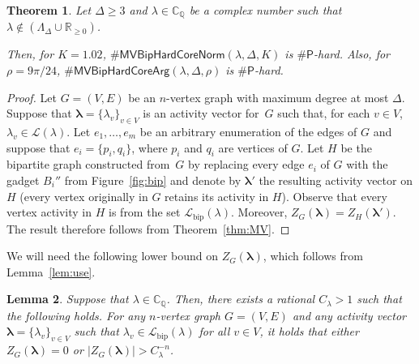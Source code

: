 \documentclass[11pt]{article}
\newtheorem{theorem}{Theorem}
\newtheorem{lemma}[theorem]{Lemma}
\def\numP{\#\mathsf{P}}
\def\Reals{\mathbb{R}}
\def\CQ{\mathbb{C}_{\mathbb{Q}}}
\def\LambdaD{\Lambda_\Delta}
\def\Lbip{\mathcal{L}_{\mathrm{bip}}}
\def\lambdab{\ensuremath{\boldsymbol{\lambda}}}
\def\FactorMVBipHardCore#1{\#\ensuremath{\mathsf{MVBipHardCoreNorm}(\lambda,\Delta,#1)}}
\def\ArgMVBipHardCore#1{\#\ensuremath{\mathsf{MVBipHardCoreArg}(\lambda,\Delta,#1)}}
\begin{document}
\begin{theorem}\label{thm:BipMV}
Let $\Delta\geq 3$ and  
$\lambda\in \CQ$ be a complex number such that
$\lambda\not\in (\LambdaD \cup \Reals_{\geq 0})$.  

Then, for $ K  =1.02$,
$\FactorMVBipHardCore{K}$ is $\numP$-hard. Also, for $\rho = 9\pi/24$, 
$\ArgMVBipHardCore{\rho}$ is $\numP$-hard.
\end{theorem}
\begin{proof}
Let $G=(V,E)$ be an $n$-vertex graph with maximum degree at most $\Delta$. Suppose that $\lambdab=\{\lambda_v\}_{v\in V}$ is an activity vector for~$G$ such that,
for each $v\in V$, $\lambda_v \in \mathcal{L}(\lambda)$. Let $e_1,\hdots, e_m$ be an arbitrary enumeration of the edges of $G$ and suppose that $e_i=\{p_i,q_i\}$, where $p_i$ and $q_i$ are vertices of $G$.  Let $H$ be the bipartite graph constructed from~$G$ by  
replacing every edge $e_i$ of $G$ with the gadget $B_i''$ from Figure~\ref{fig:bip} and denote by $\lambdab'$ the resulting activity vector on $H$ (every vertex originally in $G$ retains its activity in $H$). Observe that every vertex activity in $H$ is from the set $\Lbip(\lambda)$. Moreover, $Z_G(\lambdab)= Z_H(\lambdab')$. The result therefore follows from Theorem~\ref{thm:MV}.
\end{proof}







We will need the following lower bound on $Z_G(\lambdab)$, which follows from Lemma~\ref{lem:use}. 
\begin{lemma}
\label{lem:LB}
Suppose that $\lambda\in \CQ$.
Then,  there exists a  rational $C_\lambda>1$ such that the following holds. For any $n$-vertex graph $G=(V,E)$
and any activity vector $\lambdab=\{\lambda_v\}_{v\in V}$ such that $\lambda_v\in \Lbip(\lambda)$ for all $v\in V$, it holds that either $Z_G(\lambdab)=0$ or
$|Z_G(\lambdab)| > C_\lambda^{-n}$.
\end{lemma}
\end{document}
